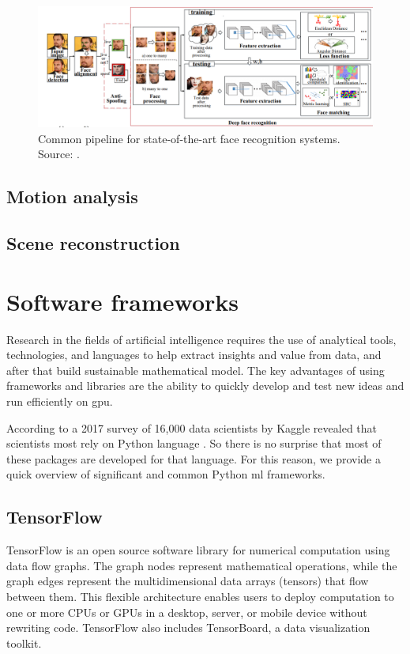         \begin{figure}[ht]
            \centering
            \includegraphics[width=1\textwidth]{resources/deep_face_recognition.png}
            \caption{Common pipeline for state-of-the-art face recognition systems. Source: \cite{wang2018deep}.}
            \label{fig:deep face recognition}
        \end{figure}

    \subsection{Motion analysis}
     
    \subsection{Scene reconstruction}

\section{Software frameworks}
    Research in the fields of artificial intelligence requires the use of analytical tools, technologies, and languages to help extract insights and value from data, and after that build sustainable mathematical model.
    The key advantages of using frameworks and libraries are the ability to quickly develop and test new ideas and run efficiently on \gls{gpu}.

    According to a 2017 survey of 16,000 data scientists by Kaggle revealed that scientists most rely on Python language \cite{mostuseddatasciencetools}. So there is no surprise that most of these packages are developed for that language. For this reason, we provide a quick overview of significant and common Python \gls{ml} frameworks.
    
    \subsection{TensorFlow}
        TensorFlow is an open source software library for numerical computation using data flow graphs. The graph nodes represent mathematical operations, while the graph edges represent the multidimensional data arrays (tensors) that flow between them. This flexible architecture enables users to deploy computation to one or more CPUs or GPUs in a desktop, server, or mobile device without rewriting code. TensorFlow also includes TensorBoard, a data visualization toolkit.

